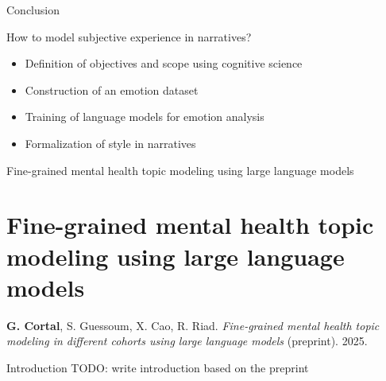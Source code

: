 \documentclass[handout,10pt]{beamer}
\begin{document}
\begin{frame}{Conclusion}

How to model subjective experience in narratives?

\vspace{0.5cm}
\pause

\begin{itemize}[<+->]
    \item Definition of objectives and scope using cognitive science
    \item Construction of an emotion dataset 
    \item Training of language models for emotion analysis 
    \item Formalization of style in narratives
\end{itemize}



    
\end{frame}

\begin{frame}{}
\Large
\begin{center}
    Fine-grained mental health topic modeling using large language models
    \section{Fine-grained mental health topic modeling using large language models}
\end{center}

\vspace{1.5cm}

\footnotesize

\textbf{G. Cortal}, S. Guessoum, X. Cao, R. Riad. \textit{Fine-grained mental health topic modeling in different cohorts using large language models} (preprint). 2025. 

\end{frame}

\begin{frame}{Introduction}
  TODO: write introduction based on the preprint
\end{frame}
\end{document}
